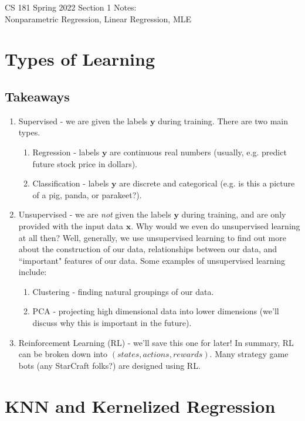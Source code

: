 \documentclass[11pt,letterpaper]{article}
\begin{document}
\begin{center}
\LARGE{CS 181 Spring 2022 Section 1 Notes:\\
Nonparametric Regression, Linear Regression, MLE}
\end{center}

\section{Types of Learning}
\subsection{Takeaways}
\begin{enumerate}
    \item Supervised - we are given the labels $\mathbf{y}$ during training. There are two main types.
    \begin{enumerate}
        \item Regression - labels $\mathbf{y}$ are continuous real numbers (usually, e.g. predict future stock price in dollars).
        \item Classification - labels $\mathbf{y}$ are discrete and categorical (e.g. is this a picture of a pig, panda, or parakeet?).  
    \end{enumerate}
    \item Unsupervised - we are \emph{not} given the labels $\mathbf{y}$ during training, and are only provided with the input data $\mathbf{x}$. Why would we even do unsupervised learning at all then? Well, generally, we use unsupervised learning to find out more about the construction of our data, relationships between our data, and ``important" features of our data. Some examples of unsupervised learning include:
    \begin{enumerate}
        \item Clustering - finding natural groupings of our data.
        \item PCA - projecting high dimensional data into lower dimensions (we'll discuss why this is important in the future).
    \end{enumerate}
    \item Reinforcement Learning (RL) - we'll save this one for later! In summary, RL can be broken down into $(states, actions, rewards)$. Many strategy game bots (any StarCraft folks?) are designed using RL.
\end{enumerate}

\section{KNN and Kernelized Regression}
\end{document}
